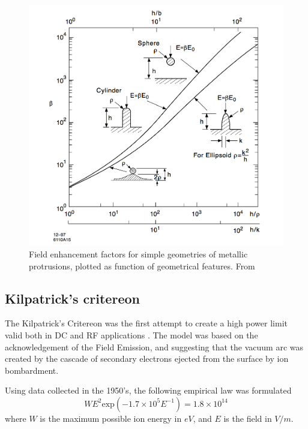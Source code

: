 \begin{figure}[h]
\centering

\includegraphics[scale=0.3]{pictures/beta_tip_val}
\caption{Field enhancement factors for simple geometries of metallic protrusions, plotted as function of geometrical features. From \cite{Rohrbach:190223}}
\label{tip_factors}

\end{figure}




\subsection[Kilpatrick's critereon]{Kilpatrick's critereon}

The Kilpatrick's Critereon was the first attempt to create a high power limit valid both in DC and RF applications \cite{KilpLimit}. The model was based on the acknowledgement of the Field Emission, and suggesting that the vacuum arc was created by the cascade of secondary electrons ejected from the surface by ion bombardment.

Using data collected in the 1950's, the following empirical law was formulated
\begin{equation}
W E^2 \text{exp} \left (  -1.7\times 10^5 E^{-1}  \right ) = 1.8 \times 10^{14}
\label{KilpLaw}
\end{equation}
where $W$ is the maximum possible ion energy in $eV$, and $E$ is the field in $V/m$.

